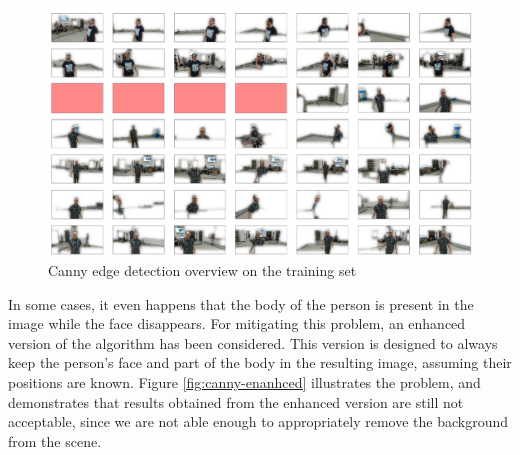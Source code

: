 \begin{figure}[!htb]
	\centering
	\includegraphics[width=1\textwidth]{"contents/images/04-1canny-overview"}
	\caption[Canny edge detection overview on the training set]{Canny edge detection overview on the training set}
	\label{fig:canny-overview}
\end{figure}

In some cases, it even happens that the body of the person is present in the image while the face disappears. For mitigating this problem, an enhanced version of the algorithm has been considered. This version is designed to always keep the person's face and part of the body in the resulting image, assuming their positions are known. Figure \ref{fig:canny-enanhced} illustrates the problem, and demonstrates that results obtained from the enhanced version are still not acceptable, since we are not able enough to appropriately remove the background from the scene.

